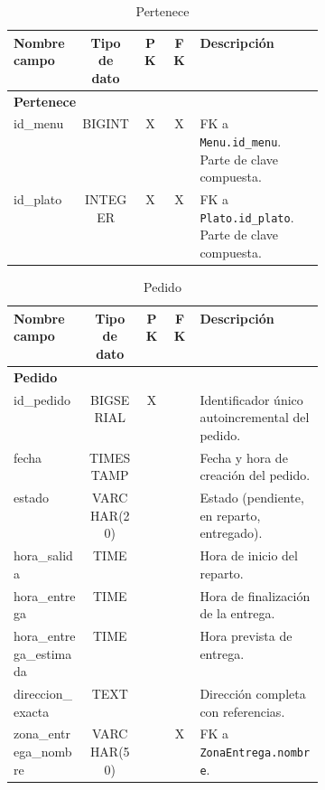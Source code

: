 \documentclass[12pt,a4paper]{article}
\begin{document}
\begin{table}[h!]
\centering
\begin{tabular}{|l|c|c|c|p{0.4\linewidth}|}
\hline
\textbf{Nombre campo}      & \textbf{Tipo de dato} & \textbf{PK} & \textbf{FK} & \textbf{Descripción} \\
\hline
\multicolumn{5}{|l|}{\textbf{Pertenece}} \\
\hline
id\_menu                    & BIGINT                 & X           & X           & FK a \texttt{Menu.id\_menu}. Parte de clave compuesta. \\
id\_plato                   & INTEGER                & X           & X           & FK a \texttt{Plato.id\_plato}. Parte de clave compuesta. \\
\hline
\end{tabular}
\caption{Pertenece}
\label{table:pertenece}
\end{table}


\begin{table}[h!]
\centering
\begin{tabular}{|l|c|c|c|p{0.4\linewidth}|}
\hline
\textbf{Nombre campo}            & \textbf{Tipo de dato}   & \textbf{PK} & \textbf{FK} & \textbf{Descripción} \\
\hline
\multicolumn{5}{|l|}{\textbf{Pedido}} \\
\hline
id\_pedido                        & BIGSERIAL               & X           &             & Identificador único autoincremental del pedido. \\
fecha                             & TIMESTAMP               &             &             & Fecha y hora de creación del pedido. \\
estado                            & VARCHAR(20)             &             &             & Estado (pendiente, en reparto, entregado). \\
hora\_salida                      & TIME                    &             &             & Hora de inicio del reparto. \\
hora\_entrega                     & TIME                    &             &             & Hora de finalización de la entrega. \\
hora\_entrega\_estimada           & TIME                    &             &             & Hora prevista de entrega. \\
direccion\_exacta                 & TEXT                    &             &             & Dirección completa con referencias. \\
zona\_entrega\_nombre             & VARCHAR(50)             &             & X           & FK a \texttt{ZonaEntrega.nombre}. \\
\hline
\end{tabular}
\caption{Pedido}
\label{table:pedido}
\end{table}
\end{document}
